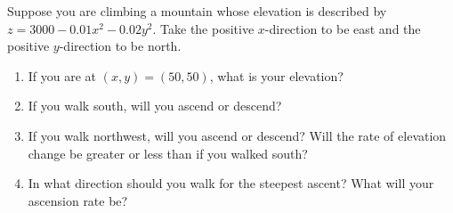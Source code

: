 \begin{Exercise}[title = {Using the Gradient to find Maximum Change}, 
label = maximum]
Suppose you are climbing a mountain whose elevation is described by $z = 3000 
- 0.01x^2 - 0.02y^2$. Take the positive $x$-direction to be east and the 
positive $y$-direction to be north. 
\begin{enumerate}
    \item If you are at $(x, y) = (50, 50)$, what is your elevation?
    \item If you walk south, will you ascend or descend?
    \item If you walk northwest, will you ascend or descend? Will the rate of 
    elevation change be greater or less than if you walked south?
    \item In what direction should you walk for the steepest ascent? What will 
    your ascension rate be?
\end{enumerate}
\end{Exercise}

